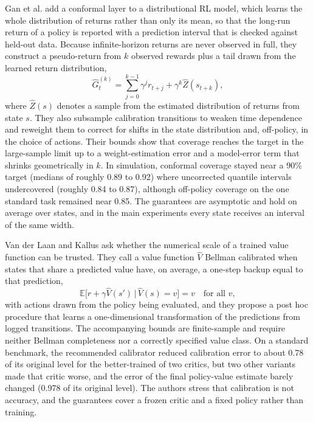 \documentclass[journal]{IEEEtran}
\begin{document}
Gan et al. \cite{gan2025conformal} add a conformal layer to a distributional RL model, which learns the whole distribution of returns rather than only its mean, so that the long-run return of a policy is reported with a prediction interval that is checked against held-out data. Because infinite-horizon returns are never observed in full, they construct a pseudo-return from $k$ observed rewards plus a tail drawn from the learned return distribution,
\begin{equation}
\hat{G}^{(k)}_{t} = \sum_{j=0}^{k-1} \gamma^{j} r_{t+j} + \gamma^{k} \hat{Z}(s_{t+k}),
\label{eq:pseudoreturn}
\end{equation}
where $\hat{Z}(s)$ denotes a sample from the estimated distribution of returns from state $s$. They also subsample calibration transitions to weaken time dependence and reweight them to correct for shifts in the state distribution and, off-policy, in the choice of actions. Their bounds show that coverage reaches the target in the large-sample limit up to a weight-estimation error and a model-error term that shrinks geometrically in $k$. In simulation, conformal coverage stayed near a 90\% target (medians of roughly 0.89 to 0.92) where uncorrected quantile intervals undercovered (roughly 0.84 to 0.87), although off-policy coverage on the one standard task remained near 0.85. The guarantees are asymptotic and hold on average over states, and in the main experiments every state receives an interval of the same width.

Van der Laan and Kallus \cite{vanderlaan2026bellman} ask whether the numerical scale of a trained value function can be trusted. They call a value function $\hat{V}$ Bellman calibrated when states that share a predicted value have, on average, a one-step backup equal to that prediction,
\begin{equation}
\mathbb{E}\big[r + \gamma \hat{V}(s') \,\big|\, \hat{V}(s) = v\big] = v \quad \text{for all } v,
\label{eq:bellmancal}
\end{equation}
with actions drawn from the policy being evaluated, and they propose a post hoc procedure that learns a one-dimensional transformation of the predictions from logged transitions. The accompanying bounds are finite-sample and require neither Bellman completeness nor a correctly specified value class. On a standard benchmark, the recommended calibrator reduced calibration error to about 0.78 of its original level for the better-trained of two critics, but two other variants made that critic worse, and the error of the final policy-value estimate barely changed (0.978 of its original level). The authors stress that calibration is not accuracy, and the guarantees cover a frozen critic and a fixed policy rather than training.
\end{document}
